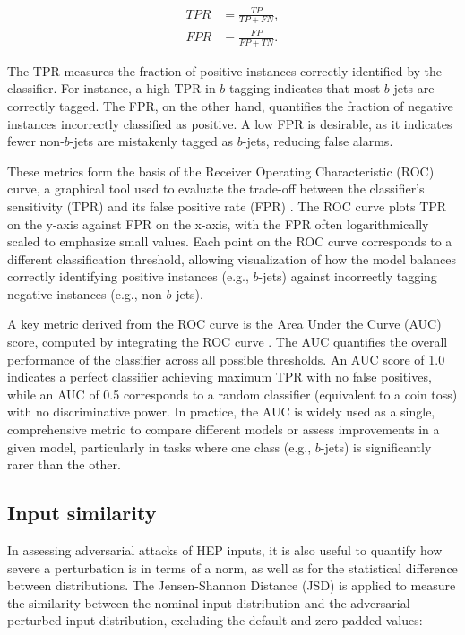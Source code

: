 \begin{align}
    TPR &= \frac{TP}{TP + FN}, \\
    FPR &= \frac{FP}{FP + TN}.
\end{align}

The TPR measures the fraction of positive instances correctly identified by the classifier. For instance, a high TPR in $b$-tagging indicates that most $b$-jets are correctly tagged. The FPR, on the other hand, quantifies the fraction of negative instances incorrectly classified as positive. A low FPR is desirable, as it indicates fewer non-$b$-jets are mistakenly tagged as $b$-jets, reducing false alarms.

These metrics form the basis of the Receiver Operating Characteristic (ROC) curve, a graphical tool used to evaluate the trade-off between the classifier’s sensitivity (TPR) and its false positive rate (FPR) \cite{hoecker2009tmvatoolkitmultivariate}. The ROC curve plots TPR on the y-axis against FPR on the x-axis, with the FPR often logarithmically scaled to emphasize small values. Each point on the ROC curve corresponds to a different classification threshold, allowing visualization of how the model balances correctly identifying positive instances (e.g., $b$-jets) against incorrectly tagging negative instances (e.g., non-$b$-jets).

A key metric derived from the ROC curve is the Area Under the Curve (AUC) score, computed by integrating the ROC curve \cite{hoecker2009tmvatoolkitmultivariate}. The AUC quantifies the overall performance of the classifier across all possible thresholds. An AUC score of 1.0 indicates a perfect classifier achieving maximum TPR with no false positives, while an AUC of 0.5 corresponds to a random classifier (equivalent to a coin toss) with no discriminative power. In practice, the AUC is widely used as a single, comprehensive metric to compare different models or assess improvements in a given model, particularly in tasks where one class (e.g., $b$-jets) is significantly rarer than the other.

\newpage
\subsection{Input similarity}
\label{sec:input_similarity}

In assessing adversarial attacks of HEP inputs, it is also useful to quantify how severe a perturbation is in terms of a norm, as well as for the statistical difference between distributions. The Jensen-Shannon Distance (JSD) is applied to measure the similarity between the nominal input distribution and the adversarial perturbed input distribution, excluding the default and zero padded values:

